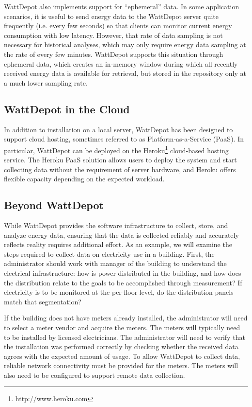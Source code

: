 WattDepot also implements support for ``ephemeral'' data. In some application scenarios, it is useful to send energy data to the WattDepot server quite frequently (i.e. every few seconds) so that clients can monitor current energy consumption with low latency. However, that rate of data sampling is not necessary for historical analyses, which may only require energy data sampling at the rate of every few minutes. WattDepot supports this situation through ephemeral data, which creates an in-memory window during which all recently received energy data is available for retrieval, but stored in the repository only at a much lower sampling rate.

\subsection{WattDepot in the Cloud}

In addition to installation on a local server, WattDepot has been designed to support cloud hosting, sometimes referred to as Platform-as-a-Service (PaaS). In particular, WattDepot can be deployed on the Heroku\footnote{http://www.heroku.com} cloud-based hosting service. The Heroku PaaS solution allows users to deploy the system and start collecting data without the requirement of server hardware, and Heroku offers flexible capacity depending on the expected workload.

\subsection{Beyond WattDepot}

While WattDepot provides the software infrastructure to collect, store, and analyze energy data, ensuring that the data is collected reliably and accurately reflects reality requires additional effort. As an example, we will examine the steps required to collect data on electricity use in a building. First, the administrator should work with manager of the building to understand the electrical infrastructure: how is power distributed in the building, and how does the distribution relate to the goals to be accomplished through measurement? If electricity is to be monitored at the per-floor level, do the distribution panels match that segmentation?

If the building does not have meters already installed, the administrator will need to select a meter vendor and acquire the meters. The meters will typically need to be installed by licensed electricians. The administrator will need to verify that the installation was performed correctly by checking whether the received data agrees with the expected amount of usage. To allow WattDepot to collect data, reliable network connectivity must be provided for the meters. The meters will also need to be configured to support remote data collection.

